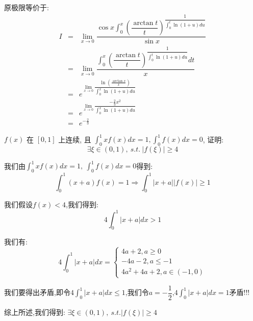 \begin{solution}
	
	原极限等价于: 
	\begin{eqnarray*}
		I&=&\lim\limits_{x\to 0}\dfrac{\cos x\int_{0}^{x}(\dfrac{\arctan t}{t})^{\dfrac{1}{\int_{0}^{t}\ln(1+u)du}}}{\sin x}\\
		&=&\lim\limits_{x\to 0}\dfrac{\int_{0}^{x}(\dfrac{\arctan t}{t})^{\dfrac{1}{\int_{0}^{t}\ln(1+u)du}}dt}{x}\\
		&=&e^{\lim\limits_{x\to 0}\dfrac{\ln(\frac{\arctan x}{x})}{\int_{0}^{x}\ln(1+u)du}}\\
		&=&e^{\lim\limits_{x\to 0}\dfrac{-\frac{2}{3}x^2}{\int_{0}^{x}\ln(1+u)du}}\\
		&=&e^{-\frac{2}{3}}
	\end{eqnarray*}
\end{solution}

\begin{example}[][Exam: 32.4.18]
	 $f(x)$ 在 $[0,1]$ 上连续, 且 $\int_{0}^{1}xf(x)dx=1, \int_{0}^{1}f(x)dx=0$, 证明: 
	 $$\exists\xi\in(0,1),\ s.t.\ \big|f(\xi)\big|\geq 4$$
\end{example}

\begin{solution}
	
	我们由$\int_{0}^{1}xf(x)dx=1,\ \int_{0}^{1}f(x)dx=0$得到: 
	$$\int_{0}^{1}(x+a)f(x)=1\Rightarrow \int_{0}^{1}|x+a||f(x)|\geq 1$$
	
	我们假设$f(x)<4$,我们得到: 
	$$4\int_{0}^{1}|x+a|dx>1$$
	
	我们有: $$4\int_{0}^{1}|x+a|dx=\left\lbrace
	\begin{array}{l}
		4a+2,a\geq 0\\
		-4a-2,a\leq -1\\
		4a^2+4a+2,a\in(-1,0)
	\end{array}
	\right. $$
	
	我们要得出矛盾,即令$4\int_{0}^{1}|x+a|dx\leq 1$,我们令$a=-\dfrac{1}{2}$,$4\int_{0}^{1}|x+a|dx=1$矛盾!!!
	
	综上所述,我们得到: $\exists\xi\in(0,1),\ s.t. |f(\xi)|\geq 4$
\end{solution}
